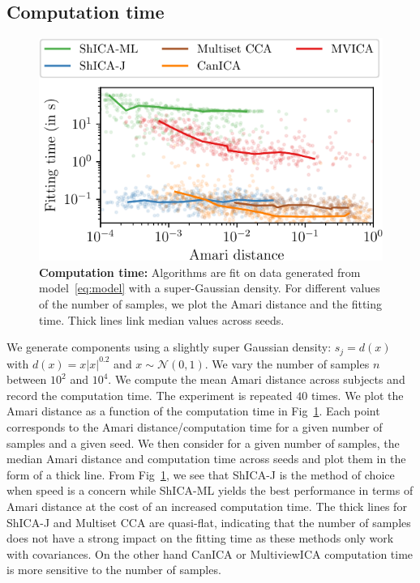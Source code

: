 \subsection{Computation time}
\begin{figure}
    \centering
    \includegraphics[width=.65\linewidth]{./figures/amvica/synthetic_Gaussian_timings.pdf}
    \caption{\textbf{Computation time: } Algorithms are fit on data generated from model~\eqref{eq:model} with a super-Gaussian density. For different values of the number of samples, we plot the Amari distance and the fitting time. Thick lines link median values across seeds.}
    \label{exp:syn_timings}
\end{figure}
We generate components using a slightly super Gaussian density: $s_j = d(x)$ with $d(x) = x |x|^{0.2}$ and $x \sim \mathcal{N}(0, 1)$. We vary the number of samples $n$ between $10^2$ and $10^4$. We compute the mean Amari distance across subjects and record the computation time. The experiment is repeated $40$ times. We plot the Amari distance as a function of the computation time in Fig~\ref{exp:syn_timings}. Each point corresponds to the Amari distance/computation time for a given number of samples and a given seed. We then consider for a given number of samples, the median Amari distance and computation time across seeds and plot them in the form of a thick line.  From Fig~\ref{exp:syn_timings}, we see that ShICA-J is the method of choice when speed is a concern while ShICA-ML yields the best performance in terms of Amari distance at the cost of an increased computation time. The thick lines for ShICA-J and Multiset CCA are quasi-flat, indicating that the number of samples does not have a strong impact on the fitting time as these methods only work with covariances. On the other hand CanICA or MultiviewICA computation time is more sensitive to the number of samples.
%




